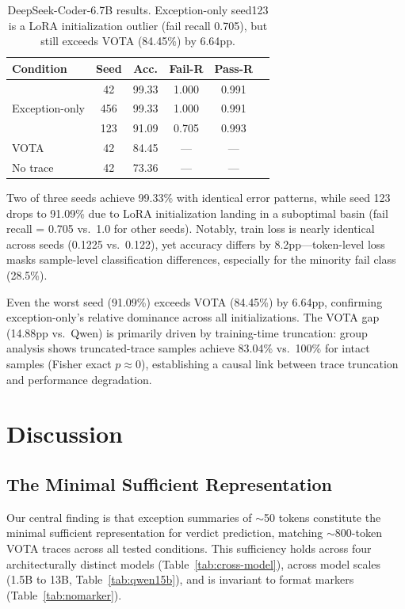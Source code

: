 \documentclass[11pt,a4paper]{article}
\begin{document}
\begin{table}[t]
\centering
\small
\begin{tabular}{lccccc}
\toprule
\textbf{Condition} & \textbf{Seed} & \textbf{Acc.} & \textbf{Fail-R} & \textbf{Pass-R} \\
\midrule
\multirow{3}{*}{Exception-only} & 42 & 99.33 & 1.000 & 0.991 \\
& 456 & 99.33 & 1.000 & 0.991 \\
& 123 & 91.09 & 0.705 & 0.993 \\
\midrule
VOTA & 42 & 84.45 & --- & --- \\
No trace & 42 & 73.36 & --- & --- \\
\bottomrule
\end{tabular}
\caption{DeepSeek-Coder-6.7B results. Exception-only seed123 is a LoRA initialization outlier (fail recall 0.705), but still exceeds VOTA (84.45\%) by 6.64pp.}
\label{tab:deepseek}
\end{table}

Two of three seeds achieve 99.33\% with identical error patterns, while seed 123 drops to 91.09\% due to LoRA initialization landing in a suboptimal basin (fail recall = 0.705 vs.\ 1.0 for other seeds).
Notably, train loss is nearly identical across seeds (0.1225 vs.\ 0.122), yet accuracy differs by 8.2pp---token-level loss masks sample-level classification differences, especially for the minority fail class (28.5\%).

Even the worst seed (91.09\%) exceeds VOTA (84.45\%) by 6.64pp, confirming exception-only's relative dominance across all initializations.
The VOTA gap (14.88pp vs.\ Qwen) is primarily driven by training-time truncation: group analysis shows truncated-trace samples achieve 83.04\% vs.\ 100\% for intact samples (Fisher exact $p \approx 0$), establishing a causal link between trace truncation and performance degradation.

\section{Discussion}

\subsection{The Minimal Sufficient Representation}

Our central finding is that exception summaries of ${\sim}$50 tokens constitute the minimal sufficient representation for verdict prediction, matching ${\sim}$800-token VOTA traces across all tested conditions.
This sufficiency holds across four architecturally distinct models (Table~\ref{tab:cross-model}), across model scales (1.5B to 13B, Table~\ref{tab:qwen15b}), and is invariant to format markers (Table~\ref{tab:nomarker}).
\end{document}
